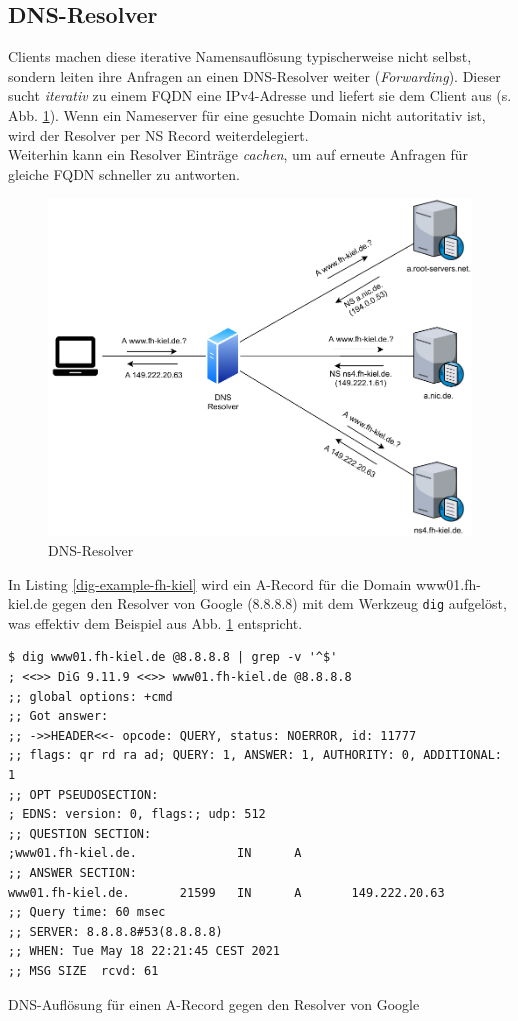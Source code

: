 \subsection{DNS-Resolver}
\gls{Client}s machen diese iterative Namensauflösung typischerweise nicht selbst, sondern leiten ihre Anfragen an einen \gls{DNS}-Resolver weiter (\textit{Forwarding}). Dieser sucht \textit{iterativ} zu einem \gls{FQDN} eine IPv4-Adresse und liefert sie dem \gls{Client} aus (s. Abb. \ref{grafik: dns-resolver}). Wenn ein Nameserver für eine gesuchte Domain nicht autoritativ ist, wird der Resolver per NS Record weiterdelegiert.\\
Weiterhin kann ein Resolver Einträge \textit{cachen}, um auf erneute Anfragen für gleiche \gls{FQDN} schneller zu antworten.
\begin{figure}[h]
  \centering
  \includegraphics[scale=0.7]{Figures/dns_recursion.pdf}
  \caption{DNS-Resolver}
  \label{grafik: dns-resolver}
\end{figure}\FloatBarrier
In Listing \ref{dig-example-fh-kiel} wird ein A-Record für die Domain www01.fh-kiel.de gegen den Resolver von Google (8.8.8.8) mit dem Werkzeug \texttt{dig} aufgelöst, was effektiv dem Beispiel aus Abb. \ref{grafik: dns-resolver} entspricht.
\begin{listing}[h]
\begin{verbatim}
$ dig www01.fh-kiel.de @8.8.8.8 | grep -v '^$'
; <<>> DiG 9.11.9 <<>> www01.fh-kiel.de @8.8.8.8
;; global options: +cmd
;; Got answer:
;; ->>HEADER<<- opcode: QUERY, status: NOERROR, id: 11777
;; flags: qr rd ra ad; QUERY: 1, ANSWER: 1, AUTHORITY: 0, ADDITIONAL: 1
;; OPT PSEUDOSECTION:
; EDNS: version: 0, flags:; udp: 512
;; QUESTION SECTION:
;www01.fh-kiel.de.              IN      A
;; ANSWER SECTION:
www01.fh-kiel.de.       21599   IN      A       149.222.20.63
;; Query time: 60 msec
;; SERVER: 8.8.8.8#53(8.8.8.8)
;; WHEN: Tue May 18 22:21:45 CEST 2021
;; MSG SIZE  rcvd: 61
\end{verbatim}
\caption{DNS-Auflösung für einen A-Record gegen den Resolver von Google}
\label{dig-example-fh-kiel}
\end{listing}\FloatBarrier

